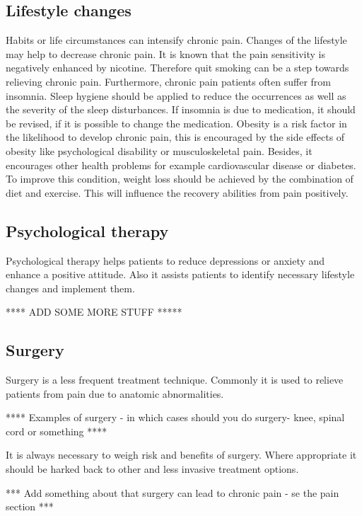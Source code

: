 \subsection{Lifestyle changes}
Habits or life circumstances can intensify chronic pain. Changes of the lifestyle may help to decrease chronic pain. It is known that the pain sensitivity is negatively enhanced by nicotine. Therefore quit smoking can be a step towards relieving chronic pain.
Furthermore, chronic pain patients often suffer from insomnia. Sleep hygiene should be applied to reduce the occurrences as well as the severity of the sleep disturbances. If insomnia is due to medication, it should be revised, if it is possible to change the medication.
Obesity is a risk factor in the likelihood to  develop chronic pain, this is encouraged by the side effects of obesity like psychological disability or musculoskeletal pain. Besides, it encourages other health problems for example cardiovascular disease or diabetes. To improve this condition, weight loss should be achieved by the combination of diet and exercise. This will influence the recovery abilities from pain positively. \cite{marcus2009,pope2017}

\subsection{Psychological therapy}
Psychological therapy helps patients to reduce depressions or anxiety and enhance a positive attitude. Also it assists patients to identify necessary lifestyle changes and implement them. \cite{marcus2009,pope2017} 

**** ADD SOME MORE STUFF *****


\subsection{Surgery}
Surgery is a less frequent treatment technique. Commonly it is used to relieve patients from pain due to anatomic abnormalities. \cite{marcus2009,pope2017} 

**** Examples of surgery - in which cases should you do surgery- knee, spinal cord or something ****

It is always necessary to weigh risk and benefits of surgery. Where appropriate it should be harked back to other and less invasive treatment options. \cite{pope2017}

*** Add something about that surgery can lead to chronic pain - se the pain section ***

